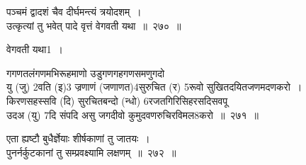 \documentclass[11pt, openany]{book}
\begin{document}

\newpage

\begin{quote}

\end{quote}
{\na पञ्चमं द्वादशं चैव दीर्घमन्त्यं त्रयोदशम्~।\\
उत्कृत्यां तु भवेत् पादे वृत्तं वेगवती यथा~॥~२७०~॥}

वेगवती यथा1~। 

{\na गगणतलंगणमभिरूहमाणो उडुगणगहगणसमणुगदो\\
यु (जु) 2वति (इ)3 ज्रणाणं (जणाणत)4सुरुचित (र) 5रूवो सुखितदयितजणमदणकरो~। \\
किरणसहस्सवि (दि) सुरचितबन्दो (न्धो) 6रजतगिरिसिहरसदिसवपू \\
उदअ (यु) 7दि संपदि असु जगदीवो कुमुदवणरुचिरविमल8करो~॥~२७१~॥}

{ }

{\na एता ह्यष्टौ बुधैर्ज्ञेयाः शीर्षकाणां तु जातयः~।\\ 
पुनर्नर्कुटकानां तु सम्प्रवक्ष्यामि लक्षणम्~॥~२७२~॥}


\newpage
\end{document}

